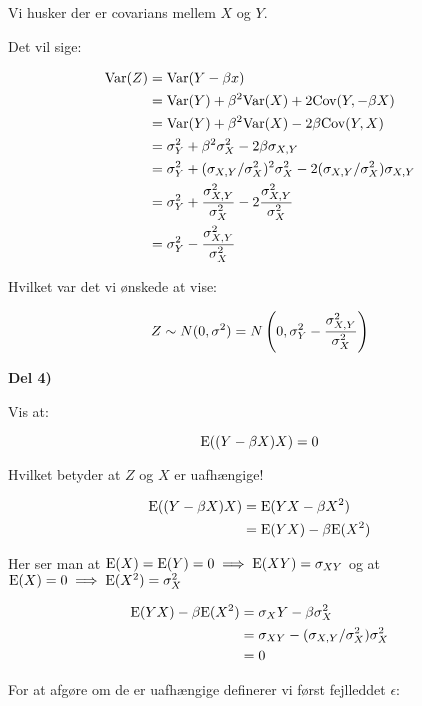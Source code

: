 Vi husker der er covarians mellem $X$ og $Y$.

Det vil sige:

\begin{align}
    \text{Var}(Z) 
    &= \text{Var}(Y - \beta x) \\
    &= \text{Var}(Y) + \beta^2 \text{Var}(X)  + 2\text{Cov}(Y, - \beta X) \\
    &= \text{Var}(Y) + \beta^2 \text{Var}(X)  - 2\beta \text{Cov}(Y, X) \\
    &= \sigma^2_Y + \beta^2 \sigma^2_X - 2\beta \sigma_{X,Y} \\
    &= \sigma^2_Y + (\sigma_{X,Y} / \sigma^2_X)^2 \sigma^2_X - 2(\sigma_{X,Y} / \sigma^2_X) \sigma_{X,Y}\\
    &= \sigma^2_Y + \frac{\sigma_{X,Y}^2}{\sigma^2_X} - 2\frac{\sigma_{X,Y}^2}{\sigma^2_X} \\
    &= \sigma^2_Y - \frac{\sigma_{X,Y}^2}{\sigma^2_X}
\end{align}

Hvilket var det vi ønskede at vise:

\begin{equation}
    Z \sim N(0, \sigma^2) = N \left( 0,\sigma^2_Y - \frac{\sigma_{X,Y}^2}{\sigma^2_X} \right)
\end{equation}

\textbf{Del 4)}

Vis at:

\begin{equation}
    \text{E}((Y - \beta X)X) = 0
\end{equation}

Hvilket betyder at $Z$ og $X$ er uafhængige!

\begin{align}
    \text{E}((Y - \beta X)X) &=
    \text{E}(YX - \beta X^2) \\
    &= \text{E}(YX) - \beta\text{E}(X^2) \\
\end{align}

Her ser man at $\text{E}(X) = \text{E}(Y) =0 \implies \text{E}(XY) = \sigma_{XY}$ og at $\text{E}(X) = 0 \implies \text{E}(X^2) = \sigma^2_X$

\begin{align}
    \text{E}(YX) - \beta\text{E}(X^2) &= \sigma_XY - \beta \sigma_X^2 \\
    &= \sigma_{XY} - (\sigma_{X,Y} / \sigma^2_X)\sigma_X^2 \\
    &= 0
\end{align}

For at afgøre om de er uafhængige definerer vi først fejlleddet $\epsilon$:

